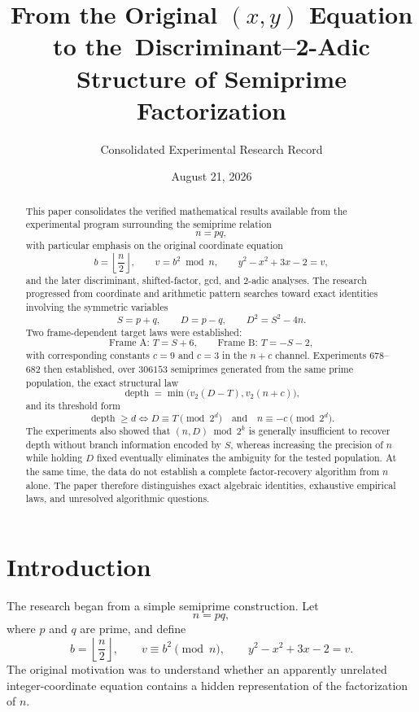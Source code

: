 \documentclass[11pt,a4paper]{article}
\title{\textbf{From the Original $(x,y)$ Equation to the\
Discriminant--2-Adic Structure of Semiprime Factorization}}
\author{Consolidated Experimental Research Record}
\date{August 21, 2026}
\begin{document}
\maketitle

\begin{abstract}
This paper consolidates the verified mathematical results available from the experimental program surrounding the semiprime relation
\[
 n=pq,
\]
with particular emphasis on the original coordinate equation
\[
 b=\left\lfloor\frac{n}{2}\right\rfloor,
 \qquad
 v=b^2\bmod n,
 \qquad
 y^2-x^2+3x-2=v,
\]
and the later discriminant, shifted-factor, gcd, and $2$-adic analyses.
The research progressed from coordinate and arithmetic pattern searches toward exact identities involving the symmetric variables
\[
 S=p+q,
 \qquad
 D=p-q,
 \qquad
 D^2=S^2-4n.
\]
Two frame-dependent target laws were established:
\[
\text{Frame A: }T=S+6,
\qquad
\text{Frame B: }T=-S-2,
\]
with corresponding constants $c=9$ and $c=3$ in the $n+c$ channel.  Experiments 678--682 then established, over $306153$ semiprimes generated from the same prime population, the exact structural law
\[
 \operatorname{depth}
 =\min\!\bigl(v_2(D-T),v_2(n+c)\bigr),
\]
and its threshold form
\[
 \operatorname{depth}\ge d
 \iff
 D\equiv T\pmod{2^d}
 \quad\text{and}\quad
 n\equiv -c\pmod{2^d}.
\]
The experiments also showed that $(n,D)\bmod 2^k$ is generally insufficient to recover depth without branch information encoded by $S$, whereas increasing the precision of $n$ while holding $D$ fixed eventually eliminates the ambiguity for the tested population.  At the same time, the data do not establish a complete factor-recovery algorithm from $n$ alone.  The paper therefore distinguishes exact algebraic identities, exhaustive empirical laws, and unresolved algorithmic questions.
\end{abstract}

\tableofcontents
\newpage

\section{Introduction}

The research began from a simple semiprime construction.  Let
\[
 n=pq,
\]
where $p$ and $q$ are prime, and define
\[
 b=\left\lfloor\frac n2\right\rfloor,
 \qquad
 v\equiv b^2\pmod n,
 \qquad
 y^2-x^2+3x-2=v.
\]
The original motivation was to understand whether an apparently unrelated integer-coordinate equation contains a hidden representation of the factorization of $n$.
\end{document}
